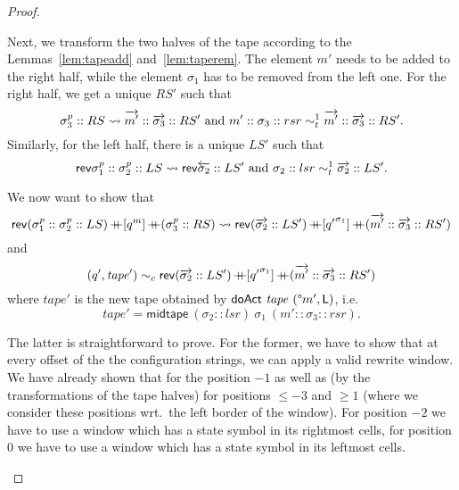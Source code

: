 \documentclass[a4paper,UKenglish,cleveref, autoref]{lipics-v2019}
\newcommand{\strent}{\rightsquigarrow}
\begin{document}
\begin{proof}
\begin{description}
\begin{description}
          Next, we transform the two halves of the tape according to the Lemmas~\ref{lem:tapeadd} and~\ref{lem:taperem}. The element $m'$ needs to be added to the right half, while the element $\sigma_1$ has to be removed from the left one. 
          For the right half, we get a unique $RS'$ such that 
          \[\sigma_3^p :: RS \strent{} \polpos{m'} :: \polpos{\sigma_3} :: RS' \text{ and } m' :: \sigma_3 :: rsr \reprt{1} \polpos{m'} :: \polpos{\sigma_3} :: RS'.\]
          Similarly, for the left half, there is a unique $LS'$ such that 
          \[\rev{\sigma_1^p :: \sigma_2^p :: LS} \strent{} \rev{\polneg{\sigma_2} :: LS'} \text{ and } \sigma_2 :: lsr \reprt{1} \polpos{\sigma_2} :: LS'.\]

          We now want to show that 
          \[\rev{(\sigma_1^p :: \sigma_2^p :: LS)} \concat [q^m] \concat (\sigma_3^p :: RS) \strent{} \rev{(\polpos{\sigma_2} :: LS')} \concat [{q'}^{\sigma_1}] \concat (\polpos{m'} :: \polpos{\sigma_3} :: RS') \]
          and 
          \[ 
            (q', \mathit{tape}') \sim_c{} \mathsf{rev}{(\overrightarrow{\sigma_2} :: LS')} \mathop{{+}\!\!\!{+}} [{q'}^{\sigma_1}] \mathop{{+}\!\!\!{+}} (\overrightarrow{m'} :: \overrightarrow{\sigma_3} :: RS') 
          \]
          where $\mathit{tape}'$ is the new tape obtained by $\textsf{doAct}~\mathit{tape}~(\degree m', \textsf{L})$, i.e.\ 
          \[\mathit{tape}' = \textsf{midtape}~(\sigma_2 :: lsr)~\sigma_1~(m' :: \sigma_3 :: rsr).\]

          The latter is straightforward to prove. For the former, we have to show that at every offset of the the configuration strings, we can apply a valid rewrite window. We have already shown that for the position $-1$ as well as (by the transformations of the tape halves) for positions $\le -3$ and $\ge 1$ (where we consider these positions wrt.\ the left border of the window).
          For position $-2$ we have to use a window which has a state symbol in its rightmost cells, for position $0$ we have to use a window which has a state symbol in its leftmost cells.


\end{description}
\end{description}
\end{proof}
\end{document}
